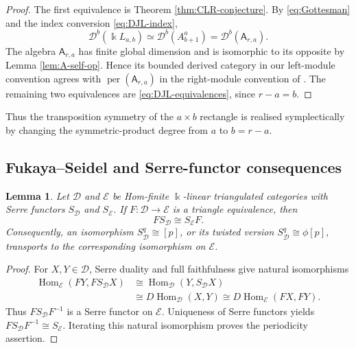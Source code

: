 \documentclass[12pt,a4paper,english,reqno]{amsart}
\theoremstyle{plain}
\newtheorem{lemma}[theorem]{Lemma}
\theoremstyle{definition}
\newcommand{\kk}{\Bbbk}
\newcommand{\perf}{\operatorname{per}}
\newcommand{\Hom}{\operatorname{Hom}}
\newcommand{\Db}[1]{{\mathscr D}^b(#1)}
\begin{document}
\begin{proof}
The first equivalence is Theorem \ref{thm:CLR-conjecture}.  By
\eqref{eq:Gottesman} and the index conversion
\eqref{eq:DJL-index},
\[
 \Db{\kk L_{a,b}}
 \simeq\Db{A_{b+1}^{a}}
 =\Db{\mathsf A_{r,a}}.
 \]
The algebra $\mathsf A_{r,a}$ has finite global dimension and is
isomorphic to its opposite by Lemma \ref{lem:A-self-op}.  Hence its bounded
derived category in our left-module convention agrees with
$\perf(\mathsf A_{r,a})$ in the right-module convention of
\cite{DJL}.  The remaining two equivalences are
\eqref{eq:DJL-equivalences}, since $r-a=b$.
\end{proof}

Thus the transposition symmetry of the $a\times b$ rectangle is realised
symplectically by changing the symmetric-product degree from $a$ to
$b=r-a$.

\subsection{Fukaya--Seidel and Serre-functor consequences}

\begin{lemma}
\label{lem:transport-serre}
Let $\mathcal D$ and $\mathcal E$ be Hom-finite
$\kk$-linear triangulated categories with Serre functors
$S_{\mathcal D}$ and $S_{\mathcal E}$.  If
$F\colon\mathcal D\to\mathcal E$ is a triangle equivalence, then
\[
 F S_{\mathcal D}\cong S_{\mathcal E}F.
\]
Consequently, an isomorphism $S_{\mathcal D}^{q}\cong[p]$, or its
twisted version $S_{\mathcal D}^{q}\cong\phi[p]$, transports to the
corresponding isomorphism on $\mathcal E$.
\end{lemma}

\begin{proof}
For $X,Y\in\mathcal D$, Serre duality and full faithfulness give natural
isomorphisms
\[
\begin{split}
 \Hom_{\mathcal E}(FY,FS_{\mathcal D}X)
 &\cong\Hom_{\mathcal D}(Y,S_{\mathcal D}X)\\
 &\cong D\Hom_{\mathcal D}(X,Y)
 \cong D\Hom_{\mathcal E}(FX,FY).
\end{split}
\]
Thus $FS_{\mathcal D}F^{-1}$ is a Serre functor on $\mathcal E$.
Uniqueness of Serre functors yields
$FS_{\mathcal D}F^{-1}\cong S_{\mathcal E}$.  Iterating this natural
isomorphism proves the periodicity assertion.
\end{proof}
\end{document}
